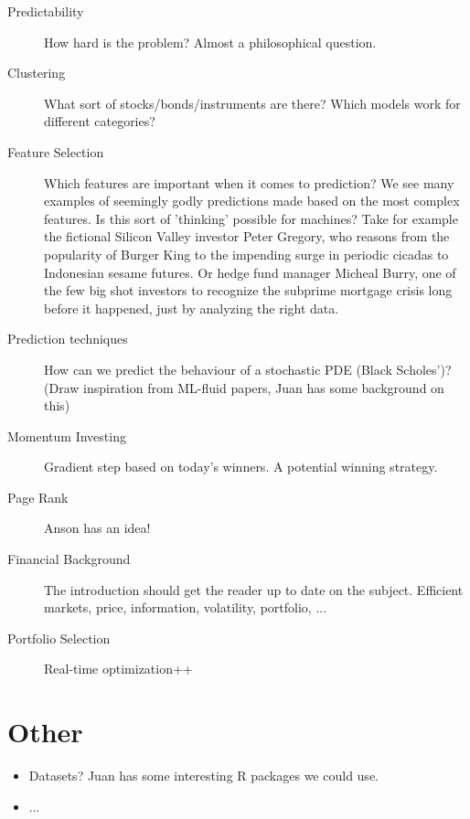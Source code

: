 \documentclass[12pt, oneside]{article}
\begin{document}
\begin{description}

\item[Predictability] How hard is the problem? Almost a philosophical question. 

\item[Clustering] What sort of stocks/bonds/instruments are there? Which models work for different categories?

\item[Feature Selection] Which features are important when it comes to prediction? We see many examples of seemingly godly predictions made based on the most complex features. Is this sort of 'thinking' possible for machines? Take for example the fictional Silicon Valley investor Peter Gregory, who reasons from the popularity of Burger King to the impending surge in periodic cicadas to Indonesian sesame futures. Or hedge fund manager Micheal Burry, one of the few big shot investors to recognize the subprime mortgage crisis long before it happened, just by analyzing the right data.

\item[Prediction techniques] How can we predict the behaviour of a stochastic PDE (Black Scholes')? (Draw inspiration from ML-fluid papers, Juan has some background on this)

\item[Momentum Investing] Gradient step based on today's winners. A potential winning strategy.

\item[Page Rank] Anson has an idea!

\item[Financial Background] The introduction should get the reader up to date on the subject. Efficient markets, price, information, volatility, portfolio, ...

\item[Portfolio Selection] Real-time optimization++

\end{description}

\section{Other}

\begin{itemize}

\item Datasets? Juan has some interesting R packages we could use. 

\item ...

\end{itemize}
\end{document}
